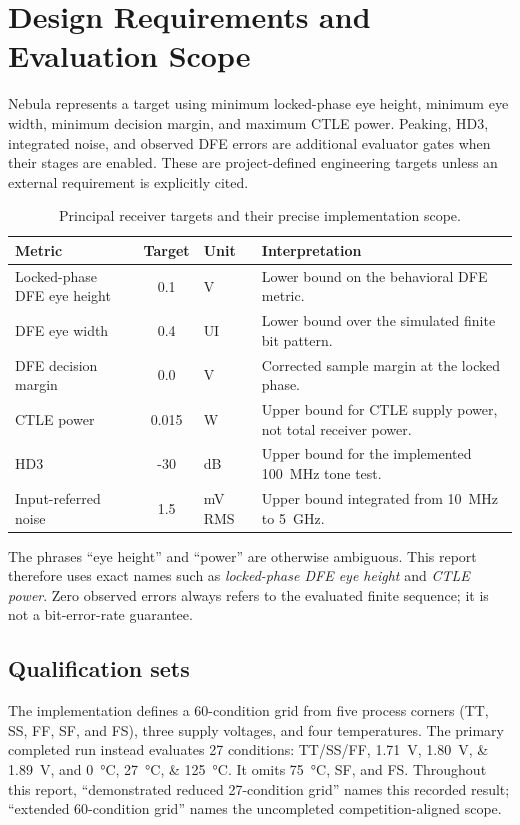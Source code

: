 \chapter{Design Requirements and Evaluation Scope}

Nebula represents a target using minimum locked-phase eye height, minimum eye
width, minimum decision margin, and maximum CTLE power. Peaking, HD3, integrated
noise, and observed DFE errors are additional evaluator gates when their stages
are enabled. These are project-defined engineering targets unless an external
requirement is explicitly cited.

\begin{table}[htbp]
\centering
\caption{Principal receiver targets and their precise implementation scope.}
\label{tab:requirements}
\begin{tabularx}{\textwidth}{@{}l S[table-format=2.3] l X@{}}
\toprule
Metric & {Target} & Unit & Interpretation \\
\midrule
Locked-phase DFE eye height & 0.1 & V & Lower bound on the behavioral DFE metric. \\
DFE eye width & 0.4 & UI & Lower bound over the simulated finite bit pattern. \\
DFE decision margin & 0.0 & V & Corrected sample margin at the locked phase. \\
CTLE power & 0.015 & W & Upper bound for CTLE supply power, not total receiver power. \\
HD3 & -30 & dB & Upper bound for the implemented \SI{100}{MHz} tone test. \\
Input-referred noise & 1.5 & mV RMS & Upper bound integrated from \SI{10}{MHz} to \SI{5}{GHz}. \\
\bottomrule
\end{tabularx}
\end{table}

The phrases ``eye height'' and ``power'' are otherwise ambiguous. This report
therefore uses exact names such as \emph{locked-phase DFE eye height} and
\emph{CTLE power}. Zero observed errors always refers to the evaluated finite
sequence; it is not a bit-error-rate guarantee.

\section{Qualification sets}

The implementation defines a 60-condition grid from five process corners
(TT, SS, FF, SF, and FS), three supply voltages, and four temperatures. The
primary completed run instead evaluates 27 conditions: TT/SS/FF,
\SIlist{1.71;1.80;1.89}{V}, and \SIlist{0;27;125}{\degreeCelsius}. It omits
\SI{75}{\degreeCelsius}, SF, and FS. Throughout this report, ``demonstrated
reduced 27-condition grid'' names this recorded result; ``extended 60-condition
grid'' names the uncompleted competition-aligned scope.

